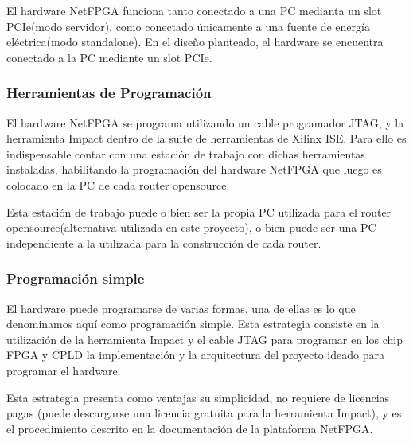 El hardware NetFPGA funciona tanto conectado a una PC medianta un slot PCIe(modo servidor), como conectado \'unicamente a una fuente de energ\'ia el\'ectrica(modo standalone). En el dise\~no planteado, el hardware se encuentra conectado a la PC mediante un slot PCIe.


\subsubsection{Herramientas de Programaci\'on}

El hardware NetFPGA se programa utilizando un cable programador JTAG, y la herramienta Impact dentro de la suite de herramientas de Xilinx ISE. Para ello es indispensable contar con una estaci\'on de trabajo con dichas herramientas instaladas, habilitando la programaci\'on  del hardware NetFPGA que luego es colocado en la PC de cada router opensource.

Esta estaci\'on de trabajo puede o bien ser la propia PC utilizada para el router opensource(alternativa utilizada en este proyecto), o bien puede ser una PC independiente a la utilizada para la construcci\'on de cada router.\\

\subsubsection{Programaci\'on simple}
El hardware puede programarse de varias formas, una de ellas es lo que denominamos aqu\'i como programaci\'on simple. Esta estrategia consiste en la utilizaci\'on de la herramienta Impact y el cable JTAG para programar en los chip FPGA y CPLD la implementaci\'on y la arquitectura del proyecto ideado para programar el hardware.

Esta estrategia presenta como ventajas su simplicidad, no requiere de licencias pagas (puede descargarse una licencia gratuita para la herramienta Impact), y es el procedimiento descrito en la documentaci\'on de la plataforma NetFPGA.

